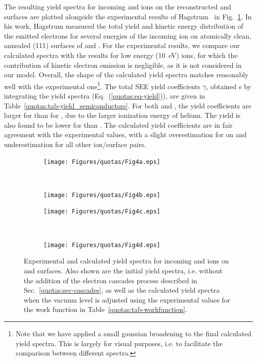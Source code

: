 \begin{refsection}
The resulting yield spectra for incoming  and  ions on the 
reconstructed  and  surfaces are plotted alongside the 
experimental results of Hagstrum~\cite{Hagstrum1960} in 
Fig.~\ref{quotas:fig-results_semiconductors}. In his work, Hagstrum measured 
the total yield and kinetic energy distribution of the emitted electrons for 
several energies of the incoming ion on atomically clean, annealed (111) 
surfaces of  and . For the experimental results, we 
compare our calculated spectra with the results for low energy 
(10~\si{\electronvolt}) ions, for which the contribution of kinetic electron 
emission is negligible, as it is not considered in our model. 
Overall, the shape of the calculated yield spectra matches reasonably well 
with the experimental one\footnote{Note that we have applied a small gaussian 
broadening to the final calculated yield spectra. This is largely for visual purposes, i.e. to facilitate 
the comparison between different spectra.}. 
The total \gls{SEE} yield coefficients $\gamma$, obtained s
by integrating the yield spectra (Eq.~(\ref{quotas:eq-yield})), are given in 
Table~\ref{quotas:tab-yield_semiconductors}. For both  and , the 
yield coefficients are larger for  than for , due to the 
larger ionization energy of helium. The yield is also found to 
be lower for  than . The calculated yield coefficients 
are in fair agreement with the experimental values, with a slight 
overestimation for  on  and underestimation for 
all other ion/surface pairs. 

\begin{figure}[ht] 
    \centering 
    \captionsetup{width=0.9\textwidth}
    \begin{subfigure}[t]{0.49\textwidth} 
        \centering 
        \texttt{[image: Figures/quotas/Fig4a.eps]} 
    \end{subfigure}%
    ~  
    \begin{subfigure}[t]{0.49\textwidth} 
        \centering 
        \texttt{[image: Figures/quotas/Fig4b.eps]} 
    \end{subfigure} 
    \begin{subfigure}[t]{0.49\textwidth} 
        \centering 
        \texttt{[image: Figures/quotas/Fig4c.eps]} 
    \end{subfigure}%
    ~  
    \begin{subfigure}[t]{0.49\textwidth} 
        \centering 
        \texttt{[image: Figures/quotas/Fig4d.eps]} 
    \end{subfigure} 
    \caption{\label{quotas:fig-results_semiconductors} Experimental and 
calculated yield spectra for incoming  and  ions on 
 and  surfaces. Also shown are the initial yield 
spectra, i.e. without the addition of the electron cascades process described 
in Sec.~\ref{quotas:sec-cascades}, as well as the calculated yield spectra 
when the vacuum level is adjusted using the experimental values for the work 
function in Table~\ref{quotas:tab-workfunction}.} 
\end{figure} 


\end{refsection}
